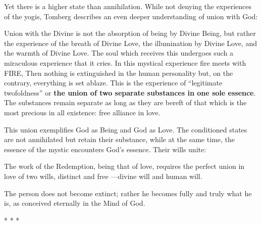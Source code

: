 Yet there is a higher state than annihilation. While not denying the experiences of the yogis, Tomberg describes an even deeper understanding of union with God:

\begin{quotex}
Union with the Divine is not the absorption of being by Divine Being, but rather the experience of the breath of Divine Love, the illumination by Divine Love, and the warmth of Divine Love. The soul which receives this undergoes such a miraculous experience that it cries. In this mystical experience fire meets with FIRE, Then nothing is extinguished in the human personality but, on the contrary, everything is set ablaze. This is the experience of ``legitimate twofoldness'' or \textbf{the union of two separate substances in one sole essence}. The substances remain separate as long as they are bereft of that which is the most precious in all existence: free alliance in love.
\end{quotex}


This union exemplifies God as Being and God as Love. The conditioned states are not annihilated but retain their substance, while at the same time, the essence of the mystic encounters God's essence. Their wills unite:

\begin{quotex}
The work of the Redemption, being that of love, requires the perfect union in love of two wills, distinct and free ---divine will and human will.
\end{quotex}


The person does not become extinct; rather he becomes fully and truly what he is, as conceived eternally in the Mind of God.



\begin{center}* * *\end{center}

